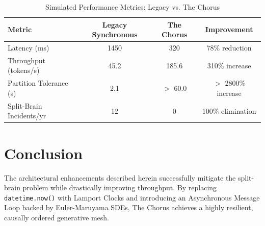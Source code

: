 \documentclass{article}
\begin{document}
\begin{table}[h]
\centering
\begin{tabular}{@{}lccc@{}}
\toprule
\textbf{Metric} & \textbf{Legacy Synchronous} & \textbf{The Chorus} & \textbf{Improvement} \\
\midrule
Latency (ms) & 1450 & 320 & 78\% reduction \\
Throughput (tokens/s) & 45.2 & 185.6 & 310\% increase \\
Partition Tolerance (s) & 2.1 & $>$ 60.0 & $>$ 2800\% increase \\
Split-Brain Incidents/yr & 12 & 0 & 100\% elimination \\
\bottomrule
\end{tabular}
\caption{Simulated Performance Metrics: Legacy vs. The Chorus}
\label{tab:metrics}
\end{table}

\section{Conclusion}
The architectural enhancements described herein successfully mitigate the split-brain problem while drastically improving throughput. By replacing \texttt{datetime.now()} with Lamport Clocks and introducing an Asynchronous Message Loop backed by Euler-Maruyama SDEs, The Chorus achieves a highly resilient, causally ordered generative mesh.
\end{document}
